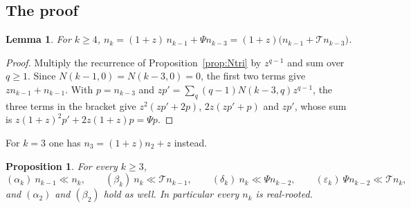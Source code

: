 \documentclass[11pt]{amsart}
\newtheorem{proposition}[theorem]{Proposition}
\newtheorem{lemma}[theorem]{Lemma}
\theoremstyle{definition}
\begin{document}
\subsection{The proof}

\begin{lemma}\label{lem:rowrec}
For $k\ge4$, $n_k=(1+z)\,n_{k-1}+\Psi n_{k-3}=(1+z)\bigl(n_{k-1}+\mathcal Tn_{k-3}\bigr)$.
\end{lemma}

\begin{proof}
Multiply the recurrence of Proposition~\ref{prop:Ntri} by $z^{q-1}$ and sum over $q\ge1$. Since $N(k-1,0)=N(k-3,0)=0$, the first two terms give $zn_{k-1}+n_{k-1}$. With $p=n_{k-3}$ and $zp'=\sum_q(q-1)N(k-3,q)z^{q-1}$, the three terms in the bracket give $z^2(zp'+2p)$, $2z(zp'+p)$ and $zp'$, whose sum is $z(1+z)^2p'+2z(1+z)p=\Psi p$.
\end{proof}

For $k=3$ one has $n_3=(1+z)n_2+z$ instead.

\begin{proposition}\label{prop:four}
For every $k\ge3$,
\[
  (\alpha_k)\ n_{k-1}\ll n_k,\qquad (\beta_k)\ n_k\ll\mathcal Tn_{k-1},\qquad (\delta_k)\ n_k\ll\Psi n_{k-2},\qquad (\varepsilon_k)\ \Psi n_{k-2}\ll\mathcal Tn_k,
\]
and $(\alpha_2)$ and $(\beta_2)$ hold as well. In particular every $n_k$ is real-rooted.
\end{proposition}
\end{document}
